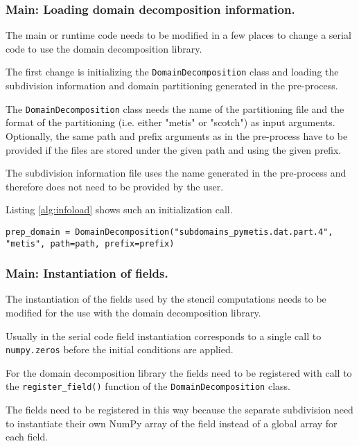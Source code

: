 \subsubsection{Main: Loading domain decomposition information.}
\label{sec:main_loading}
The main or runtime code needs to be modified in a few places to change a serial code to use the domain decomposition library.

The first change is initializing the \texttt{DomainDecomposition} class and loading the subdivision information and domain partitioning generated in the pre-process.

The \texttt{DomainDecomposition} class needs the name of the partitioning file and the format of the partitioning (i.e. either "metis" or "scotch") as input arguments.
Optionally, the same path and prefix arguments as in the pre-process have to be provided if the files are stored under the given path and using the given prefix.

The subdivision information file uses the name generated in the pre-process and therefore does not need to be provided by the user.

Listing \ref{alg:infoload} shows such an initialization call.

\begin{lstlisting}[caption={Example code for the loading of the domain decomposition information.},captionpos=b, label={alg:infoload}, float, floatplacement=H]
prep_domain = DomainDecomposition("subdomains_pymetis.dat.part.4", "metis", path=path, prefix=prefix)
\end{lstlisting}

\subsubsection{Main: Instantiation of fields.}
The instantiation of the fields used by the stencil computations needs to be modified for the use with the domain decomposition library.

Usually in the serial code field instantiation corresponds to a single call to \texttt{numpy.zeros} before the initial conditions are applied.

For the domain decomposition library the fields need to be registered with call to the \texttt{register\_field()} function of the \texttt{DomainDecomposition} class.

The fields need to be registered in this way because the separate subdivision need to instantiate their own NumPy array of the field instead of a global array for each field.

